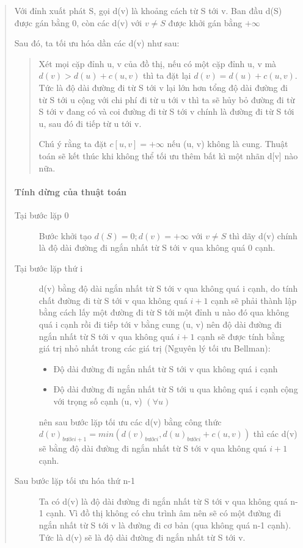 \documentclass[a4paper,10pt]{article}
\begin{document}
\begin{quote}
  Với đỉnh xuất phát S, gọi d(v) là khoảng cách từ S tới v. Ban đầu d(S) được gán bằng 0, còn các d(v) với $v \neq S$ được khởi gán bằng $+\infty$

Sau đó, ta tối ưu hóa dần các d(v) như sau:
\begin{quotation}
  Xét mọi cặp đỉnh u, v của đồ thị, nếu có một cặp đỉnh u, v mà $d(v) > d(u) + c(u, v)$ thì ta đặt lại $d(v) = d(u) + c(u, v)$. Tức là độ dài đường đi từ S tới v lại lớn hơn tổng độ dài đường đi từ S tới u cộng với chi phí đi từ u tới v thì ta sẽ hủy bỏ đường đi từ S tới v đang có và coi đường đi từ S tới v chính là đường đi từ S tới u, sau đó đi tiếp từ u tới v.

Chú ý rằng ta đặt $c[u, v] = +\infty$ nếu (u, v) không là cung. Thuật toán sẽ kết thúc khi không thể tối ưu thêm bất kì một nhãn d[v] nào nữa.
\end{quotation}

\paragraph{Tính dừng của thuật toán}
\begin{description}
\item[Tại bước lặp 0] Bước khởi tạo $d(S) = 0; d(v) = +\infty$ với $v \neq S$ thì dãy d(v) chính là độ dài đường đi ngắn nhất từ S tới v qua không quá 0 cạnh.
\item[Tại bước lặp thứ i] d(v) bằng độ dài ngắn nhất từ S tới v qua không quá i cạnh, do tính chất đường đi từ S tới v qua không quá $i+1$ cạnh sẽ phải thành lập bằng cách lấy một đường đi từ S tới một đỉnh u nào đó qua không quá i cạnh rồi đi tiếp tới v bằng cung (u, v) nên độ dài đường đi ngắn nhất từ S tới v qua không quá $i+1$ cạnh sẽ được tính bằng giá trị nhỏ nhất trong các giá trị (Nguyên lý tối ưu Bellman):
  \begin{itemize}
  \item Độ dài đường đi ngắn nhất từ S tới v qua không quá i cạnh
  \item Độ dài đường đi ngắn nhất từ S tới u qua không quá i cạnh cộng với trọng số cạnh (u, v) $(\forall u)$
  \end{itemize}
nên sau bước lặp tối ưu các d(v) bằng công thức $d(v)_{bước i+1} = min(d(v)_{bước i}, d(u)_{bước i} + c(u, v))$ thì các d(v) sẽ bằng độ dài đường đi ngắn nhất từ S tới v qua không quá $i+1$ cạnh.
\item[Sau bước lặp tối ưu hóa thứ n-1] Ta có d(v) là độ dài đường đi ngắn nhất từ S tới v qua không quá n-1 cạnh. Vì đồ thị không có chu trình âm nên sẽ có một đường đi ngắn nhất từ S tới v là đường đi cơ bản (qua không quá n-1 cạnh). Tức là d(v) sẽ là độ dài đường đi ngắn nhất từ S tới v.
\end{description}


\end{quote}
\end{document}
